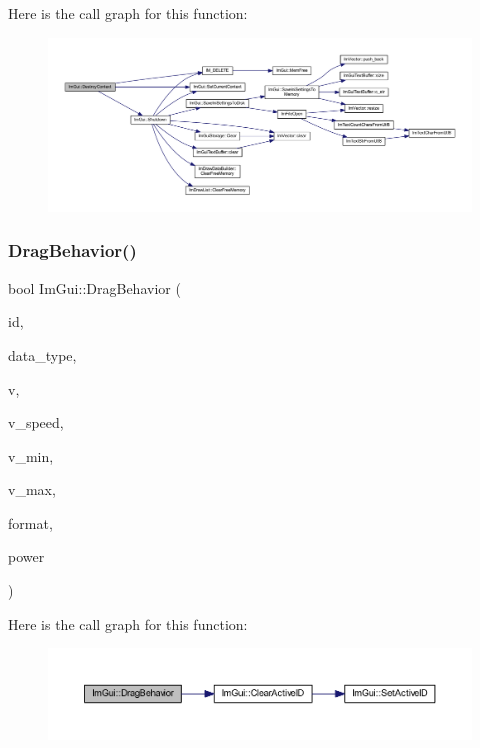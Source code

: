 Here is the call graph for this function\+:
\nopagebreak
\begin{figure}[H]
\begin{center}
\leavevmode
\includegraphics[width=350pt]{namespace_im_gui_ab9132deece575023170cd8e681d0581d_cgraph}
\end{center}
\end{figure}
\mbox{\label{namespace_im_gui_aa92640ed1ce4a58db1976487d6c4dea2}} 
\subsubsection{\texorpdfstring{Drag\+Behavior()}{DragBehavior()}}
{\footnotesize\ttfamily bool Im\+Gui\+::\+Drag\+Behavior (\begin{DoxyParamCaption}\item[{\mbox{\hyperlink{imgui_8h_a1785c9b6f4e16406764a85f32582236f}{Im\+Gui\+ID}}}]{id,  }\item[{\mbox{\hyperlink{imgui_8h_a4cfa8697a3d76722fff83eb18922e9d5}{Im\+Gui\+Data\+Type}}}]{data\+\_\+type,  }\item[{void $\ast$}]{v,  }\item[{float}]{v\+\_\+speed,  }\item[{const void $\ast$}]{v\+\_\+min,  }\item[{const void $\ast$}]{v\+\_\+max,  }\item[{const char $\ast$}]{format,  }\item[{float}]{power }\end{DoxyParamCaption})}

Here is the call graph for this function\+:
\nopagebreak
\begin{figure}[H]
\begin{center}
\leavevmode
\includegraphics[width=350pt]{namespace_im_gui_aa92640ed1ce4a58db1976487d6c4dea2_cgraph}
\end{center}
\end{figure}
\mbox{\label{namespace_im_gui_a36170175bcdad063eff30717dae91108}} 
